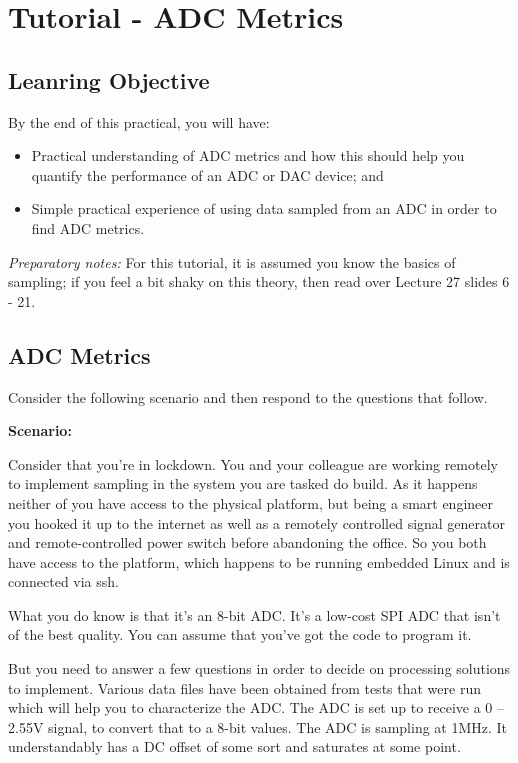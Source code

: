\section{Tutorial - ADC Metrics}

\subsection{Leanring Objective}

By the end of this practical, you will have:
\begin{itemize}
    \item Practical understanding of ADC metrics and how this should help you quantify the performance of an ADC or DAC device; and
    \item Simple practical experience of using data sampled from an ADC in order to find ADC metrics.
\end{itemize}

\textit{Preparatory notes:} For this tutorial, it is assumed you know the basics of sampling; if you feel a bit shaky on this theory, then read over Lecture 27 slides 6 - 21.

\subsection{ADC Metrics}

Consider the following scenario and then respond to the questions that follow.

\textbf{Scenario:}

Consider that you’re in lockdown. You and your colleague are working remotely to implement sampling in the system you are tasked do build. As it happens neither of you have access to the physical platform, but being a smart engineer you hooked it up to the internet as well as a remotely controlled signal generator and remote-controlled power switch before abandoning the office. So you both have access to the platform, which happens to be running embedded Linux and is connected via ssh. 

What you do know is that it’s an 8-bit ADC. It’s a low-cost SPI ADC that isn’t of the best quality. You can assume that you’ve got the code to program it. 

But you need to answer a few questions in order to decide on processing solutions to implement. Various data files have been obtained from tests that were run which will help you to characterize the ADC. The ADC is set up to receive a 0 – 2.55V signal, to convert that to a 8-bit values. The ADC is sampling at 1MHz. It understandably has a DC offset of some sort and saturates at some point.

